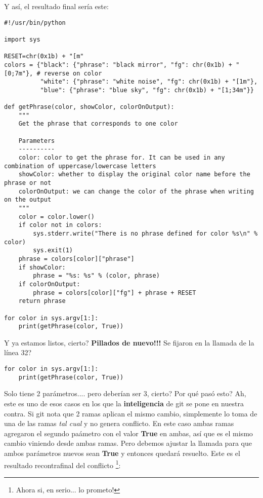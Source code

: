 Y así, el resultado final sería este:

\begin{lstlisting}[style=python_style,
	basicstyle=\small,
	caption={\bf Ejemplo 16} - conflictos resueltos]
#!/usr/bin/python

import sys

RESET=chr(0x1b) + "[m"
colors = {"black": {"phrase": "black mirror", "fg": chr(0x1b) + "[0;7m"}, # reverse on color
          "white": {"phrase": "white noise", "fg": chr(0x1b) + "[1m"},
          "blue": {"phrase": "blue sky", "fg": chr(0x1b) + "[1;34m"}}

def getPhrase(color, showColor, colorOnOutput):
    """
    Get the phrase that corresponds to one color
    
    Parameters
    ----------
    color: color to get the phrase for. It can be used in any combination of uppercase/lowercase letters
    showColor: whether to display the original color name before the phrase or not
    colorOnOutput: we can change the color of the phrase when writing on the output
    """
    color = color.lower()
    if color not in colors:
        sys.stderr.write("There is no phrase defined for color %s\n" % color)
        sys.exit(1)
    phrase = colors[color]["phrase"]
    if showColor:
        phrase = "%s: %s" % (color, phrase)
    if colorOnOutput:
        phrase = colors[color]["fg"] + phrase + RESET
    return phrase

for color in sys.argv[1:]:
    print(getPhrase(color, True))
\end{lstlisting}

Y ya estamos listos, cierto? {\bf Pillados de nuevo!!!} Se fijaron en la llamada de la línea 32?

\begin{lstlisting}[style=python_style,
	firstnumber=31,
	basicstyle=\small,
	caption={\bf Ejemplo 16} - llamada que debe ser ajustada]
for color in sys.argv[1:]:
    print(getPhrase(color, True))
\end{lstlisting}

Solo tiene 2 parámetros.... pero deberían ser 3, cierto? Por qué pasó esto? Ah, este es uno de esos casos en los que la
{\bf inteligencia} de git se pone en nuestra contra. Si git nota que 2 ramas aplican el mismo cambio, simplemente lo toma
de una de las ramas {\it tal cual} y no genera conflicto. En este caso ambas ramas agregaron el segundo paámetro con el valor
{\bf True} en ambas, así que es el mismo cambio viniendo desde ambas ramas. Pero debemos ajustar la llamada para que ambos parámetros
nuevos sean {\bf True} y entonces quedará resuelto. Este es el resultado recontrafinal del conflicto
\footnote{Ahora si, en serio... lo prometo!}:

